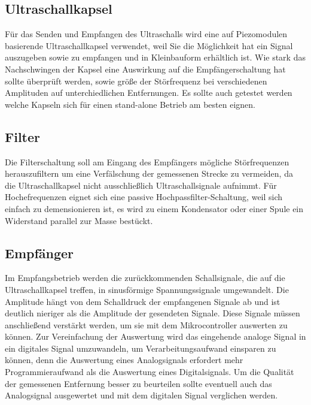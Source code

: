 \subsection{Ultraschallkapsel}
Für das Senden und Empfangen des Ultraschalls wird eine auf Piezomodulen basierende Ultraschallkapsel verwendet, weil Sie die Möglichkeit hat ein Signal auszugeben sowie zu empfangen und in Kleinbauform erhältlich ist. Wie stark das Nachschwingen der Kapsel eine Auswirkung auf die Empfängerschaltung hat sollte überprüft werden, sowie größe der Störfrequenz bei verschiedenen Amplituden auf unterchiedlichen Entfernungen. Es sollte auch getestet werden welche Kapseln sich für einen stand-alone Betrieb am besten eignen.

\subsection{Filter}
Die Filterschaltung soll am Eingang des Empfängers mögliche Störfrequenzen herauszufiltern um eine Verfälschung der gemessenen Strecke zu vermeiden, da die Ultraschallkapsel nicht ausschließlich Ultraschallsignale aufnimmt. Für Hochefrequenzen eignet sich eine passive Hochpassfilter-Schaltung, weil sich einfach zu demensionieren ist, es wird zu einem Kondensator oder einer Spule ein Widerstand parallel zur Masse bestückt. 

\subsection{Empfänger}
Im Empfangsbetrieb werden die zurückkommenden Schallsignale, die auf die Ultraschallkapsel treffen, in sinusförmige Spannungssignale umgewandelt. Die Amplitude hängt von dem Schalldruck der empfangenen Signale ab und ist deutlich nieriger als die Amplitude der gesendeten Signale. Diese Signale müssen anschließend verstärkt werden, um sie mit dem Mikrocontroller auswerten zu können. Zur Vereinfachung der Auswertung wird das eingehende analoge Signal in ein digitales Signal umzuwandeln, um Verarbeitungsaufwand einsparen zu können, denn die Auswertung eines Analogsignals erfordert mehr Programmieraufwand als die Auswertung eines Digitalsignals. Um die Qualität der gemessenen Entfernung besser zu beurteilen sollte eventuell auch das Analogsignal ausgewertet und mit dem digitalen Signal verglichen werden. 












